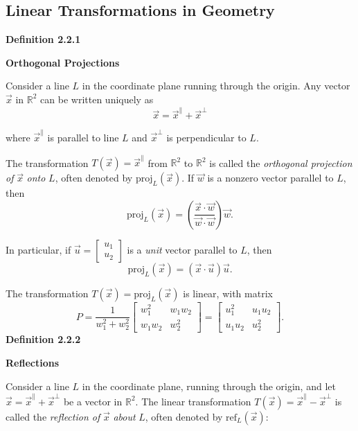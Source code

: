 \subsection{Linear Transformations in Geometry}
\textbf{Definition 2.2.1}\\
\par\noindent\textbf{Orthogonal Projections}
\par\noindent Consider a line $L$ in the coordinate plane running through the origin. Any vector $\vec{x}$ in $\mathbb{R}^{2}$ can be written uniquely as
\[\vec{x}=\vec{x}^{\parallel}+\vec{x}^{\bot}\]
\par\noindent where $\vec{x}^{\parallel}$ is parallel to line $L$ and $\vec{x}^{\bot}$ is perpendicular to $L$.
\par\noindent The transformation $T(\vec{x})=\vec{x}^{\parallel}$ from $\mathbb{R}^{2}$ to $\mathbb{R}^{2}$ is called the \textit{orthogonal projection of} $\vec{x}$ \textit{onto} $L$, often denoted by $\textrm{proj}_{L}(\vec{x})$. If $\vec{w}$ is a nonzero vector parallel to $L$, then
\[\textrm{proj}_{L}(\vec{x})=\left(\frac{\vec{x}\cdot\vec{w}}{\vec{w}\cdot\vec{w}}\right)\vec{w}.\]
\par\noindent In particular, if $\vec{u}=\left[\begin{array}{c}u_{1}\\ u_{2}\end{array}\right]$ is a \textit{unit} vector parallel to $L$, then
\[\textrm{proj}_{L}(\vec{x})=(\vec{x}\cdot\vec{u})\vec{u}.\]
\par\noindent The transformation $T(\vec{x})=\textrm{proj}_{L}(\vec{x})$ is linear, with matrix
\[P=\frac{1}{w_{1}^{2}+w_{2}^{2}}\left[\begin{array}{cc}w_{1}^{2}&w_{1}w_{2}\\ w_{1}w_{2}&w_{2}^{2}\end{array}\right]=\left[\begin{array}{cc}u_{1}^{2}&u_{1}u_{2}\\ u_{1}u_{2}&u_{2}^{2}\end{array}\right].\]
\textbf{Definition 2.2.2}\\
\par\noindent\textbf{Reflections}
\par\noindent Consider a line $L$ in the coordinate plane, running through the origin, and let $\vec{x}=\vec{x}^{\parallel}+\vec{x}^{\bot}$ be a vector in $\mathbb{R}^{2}$. The linear transformation $T(\vec{x})=\vec{x}^{\parallel}-\vec{x}^{\bot}$ is called the \textit{reflection of} $\vec{x}$ \textit{about} $L$, often denoted by $\textrm{ref}_{L}(\vec{x})$:
